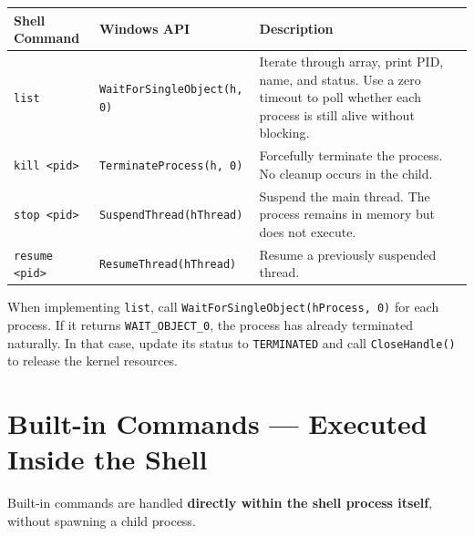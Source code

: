 \documentclass[12pt,a4paper]{article}
\begin{document}
\begin{center}
\renewcommand{\arraystretch}{1.3}
\begin{tabularx}{\textwidth}{l l X}
    \toprule
    \textbf{Shell Command} & \textbf{Windows API} & \textbf{Description} \\
    \midrule
    \texttt{list} & \texttt{WaitForSingleObject(h, 0)} & Iterate through array, print PID, name, and status. Use a zero timeout to poll whether each process is still alive without blocking. \\
    \texttt{kill <pid>} & \texttt{TerminateProcess(h, 0)} & Forcefully terminate the process. No cleanup occurs in the child. \\
    \texttt{stop <pid>} & \texttt{SuspendThread(hThread)} & Suspend the main thread. The process remains in memory but does not execute. \\
    \texttt{resume <pid>} & \texttt{ResumeThread(hThread)} & Resume a previously suspended thread. \\
    \bottomrule
\end{tabularx}
\end{center}

\begin{tipbox}
    When implementing \texttt{list}, call \texttt{WaitForSingleObject(hProcess, 0)} for each process. If it returns \texttt{WAIT\_OBJECT\_0}, the process has already terminated naturally. In that case, update its status to \texttt{TERMINATED} and call \texttt{CloseHandle()} to release the kernel resources.
\end{tipbox}

\section{Built-in Commands --- Executed Inside the Shell}

Built-in commands are handled \textbf{directly within the shell process itself}, without spawning a child process.
\end{document}
